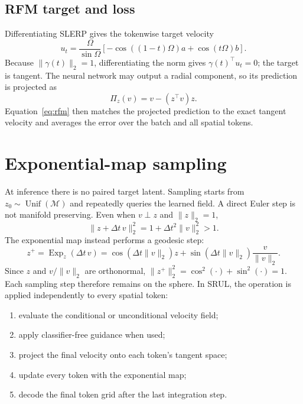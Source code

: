 \documentclass{article}
\begin{document}
\subsection{RFM target and loss}
Differentiating SLERP gives the tokenwise target velocity
\begin{equation}
 u_t=\frac{\Omega}{\sin\Omega}
 \left[-\cos((1-t)\Omega)a+\cos(t\Omega)b\right].
\end{equation}
Because $\|\gamma(t)\|_2=1$, differentiating the norm gives $\gamma(t)^\top u_t=0$; the target is tangent. The neural network may output a radial component, so its prediction is projected as
\begin{equation}
 \Pi_z(v)=v-(z^\top v)z.
\end{equation}
Equation~\eqref{eq:rfm} then matches the projected prediction to the exact tangent velocity and averages the error over the batch and all spatial tokens.

\section{Exponential-map sampling}
\label{app:exp}
At inference there is no paired target latent. Sampling starts from $z_0\sim\operatorname{Unif}(\mathcal M)$ and repeatedly queries the learned field. A direct Euler step is not manifold preserving. Even when $v\perp z$ and $\|z\|_2=1$,
\begin{equation}
 \|z+\Delta t\,v\|_2^2=1+\Delta t^2\|v\|_2^2>1.
\end{equation}
The exponential map instead performs a geodesic step:
\begin{equation}
 z^+=\operatorname{Exp}_z(\Delta t\,v)
 =\cos(\Delta t\|v\|_2)z
 +\sin(\Delta t\|v\|_2)\frac{v}{\|v\|_2}.
\end{equation}
Since $z$ and $v/\|v\|_2$ are orthonormal, $\|z^+\|_2^2=\cos^2(\cdot)+\sin^2(\cdot)=1$. Each sampling step therefore remains on the sphere. In SRUL, the operation is applied independently to every spatial token:
\begin{enumerate}
 \item evaluate the conditional or unconditional velocity field;
 \item apply classifier-free guidance when used;
 \item project the final velocity onto each token's tangent space;
 \item update every token with the exponential map;
 \item decode the final token grid after the last integration step.
\end{enumerate}
\end{document}
